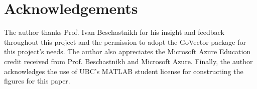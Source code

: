 \documentclass[sigconf,nonacm,11pt]{acmart}
\begin{document}
\section*{Acknowledgements}
The author thanks Prof. Ivan Beschastnikh for his insight and feedback throughout this project and the permission to adopt the GoVector package for this project's needs. The author also appreciates the Microsoft Azure Education credit received from Prof. Beschastnikh and Microsoft Azure. Finally, the author acknowledges the use of UBC's MATLAB student license for constructing the figures for this paper.



\end{document}
